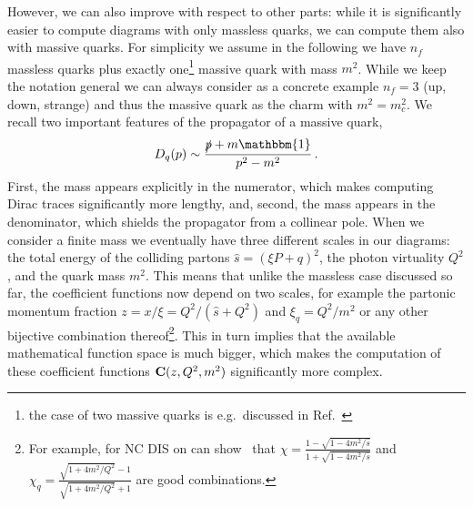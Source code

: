 However, we can also improve with respect to other parts: while it is significantly easier to compute diagrams with only massless quarks, we can compute them also with massive quarks.
For simplicity we assume in the following we have $n_f$ massless quarks plus exactly one\footnote{the case of two massive quarks is e.g.\ discussed in Ref.~\cite{Barontini:2024xgu}} massive quark with mass $m^2$.
While we keep the notation general we can always consider as a concrete example $n_f=3$ (up, down, strange) and thus the massive quark as the charm with $m^2 = m_c^2$.
We recall two important features of the propagator of a massive quark,
\begin{equation}
    D_q(p) \sim \frac{\slashed{p} + m\mathbbm{1}}{p^2 - m^2}\,. \label{eq:quarkprop}
\end{equation}
First, the mass appears explicitly in the numerator, which makes computing Dirac traces significantly more lengthy, and, second, the mass appears in the denominator, which shields the propagator from a collinear pole.
When we consider a finite mass we eventually have three different scales in our diagrams: the total energy of the colliding partons $\hat s=(\xi P + q)^2$, the photon virtuality $Q^2$, and the quark mass $m^2$.
This means that unlike the massless case discussed so far, the coefficient functions now depend on two scales, for example the partonic momentum fraction $z = x / \xi = Q^2/(\hat s + Q^2)$ and $\xi_q = Q^2 / m^2$ or any other bijective combination thereof\footnote{For example, for NC DIS on can show~\cite{Hekhorn:2019nlf} that $\chi = \frac{1-\sqrt{1-4m^2/\hat s}}{1+\sqrt{1-4m^2/\hat s}}$ and $\chi_q = \frac{\sqrt{1+4m^2/Q^2}-1}{\sqrt{1+4m^2/Q^2}+1}$ are good combinations.}.
This in turn implies that the available mathematical function space is much bigger, which makes the computation of these coefficient functions $\vb C(z,Q^2,m^2)$ significantly more complex.

